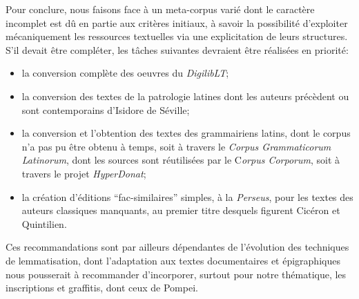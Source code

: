 Pour conclure, nous faisons face à un meta-corpus varié dont le caractère incomplet est dû en partie aux critères initiaux, à savoir la possibilité d'exploiter mécaniquement les ressources textuelles via une explicitation de leurs structures. S'il devait être compléter, les tâches suivantes devraient être réalisées en priorité:
\begin{itemize}
    \item la conversion complète des oeuvres du \textit{DigilibLT};
    \item la conversion des textes de la patrologie latines dont les auteurs précèdent ou sont contemporains d'Isidore de Séville;
    \item la conversion et l'obtention des textes des grammairiens latins, dont le corpus n'a pas pu être obtenu à temps, soit à travers le \textit{Corpus Grammaticorum Latinorum}, dont les sources sont réutilisées par le C\textit{orpus Corporum}, soit à travers le projet \textit{HyperDonat};
    \item la création d'éditions \enquote{fac-similaires} simples, à la \textit{Perseus}, pour les textes des auteurs classiques manquants, au premier titre desquels figurent Cicéron et Quintilien.
\end{itemize}
Ces recommandations sont par ailleurs dépendantes de l'évolution des techniques de lemmatisation, dont l'adaptation aux textes documentaires et épigraphiques nous pousserait à recommander d'incorporer, surtout pour notre thématique, les inscriptions et graffitis, dont ceux de Pompei.


